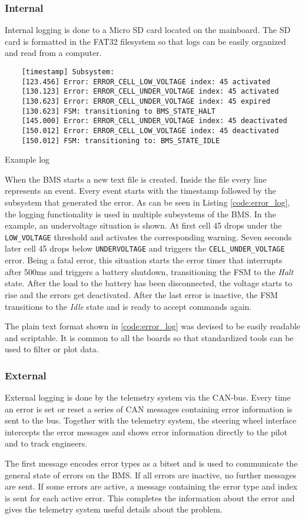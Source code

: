 \subsubsection{Internal}
Internal logging is done to a Micro SD card located on the mainboard. The SD card is formatted in the FAT32 filesystem so that logs can be easily organized and read from a computer.
\begin{listing}[H]
	\begin{verbatim}
	[timestamp] Subsystem: 
	[123.456] Error: ERROR_CELL_LOW_VOLTAGE index: 45 activated
	[130.123] Error: ERROR_CELL_UNDER_VOLTAGE index: 45 activated
	[130.623] Error: ERROR_CELL_UNDER_VOLTAGE index: 45 expired
	[130.623] FSM: transitioning to BMS_STATE_HALT
	[145.000] Error: ERROR_CELL_UNDER_VOLTAGE index: 45 deactivated
	[150.012] Error: ERROR_CELL_LOW_VOLTAGE index: 45 deactivated
	[150.012] FSM: transitioning to: BMS_STATE_IDLE
	\end{verbatim}
	\caption{Example log}
	\label{code:error_log}
\end{listing}
When the BMS starts a new text file is created. Inside the file every line represents an event. Every event starts with the timestamp followed by the subsystem that generated the error. As can be seen in Listing \autoref{code:error_log}, the logging functionality is used in multiple subsystems of the BMS. In the example, an undervoltage situation is shown. At first cell 45 drops under the \texttt{LOW\_VOLTAGE} threshold and activates the corresponding warning. Seven seconds later cell 45 drops below \texttt{UNDERVOLTAGE} and triggers the \texttt{CELL\_UNDER\_VOLTAGE} error. Being a fatal error, this situation starts the error timer that interrupts after 500ms and triggers a battery shutdown, transitioning the FSM to the \textit{Halt} state. After the load to the battery has been disconnected, the voltage starts to rise and the errors get deactivated. After the last error is inactive, the FSM transitions to the \textit{Idle} state and is ready to accept commands again.

The plain text format shown in \autoref{code:error_log} was devised to be easily readable and scriptable. It is common to all the boards so that standardized tools can be used to filter or plot data.

\subsubsection{External}
External logging is done by the telemetry system via the CAN-bus. Every time an error is set or reset a series of CAN messages containing error information is sent to the bus. Together with the telemetry system, the steering wheel interface intercepts the error messages and shows error information directly to the pilot and to track engineers.

The first message encodes error types as a bitset and is used to communicate the general state of errors on the BMS. If all errors are inactive, no further messages are sent. If some errors are active, a message containing the error type and index is sent for each active error. This completes the information about the error and gives the telemetry system useful details about the problem.

\newpage

